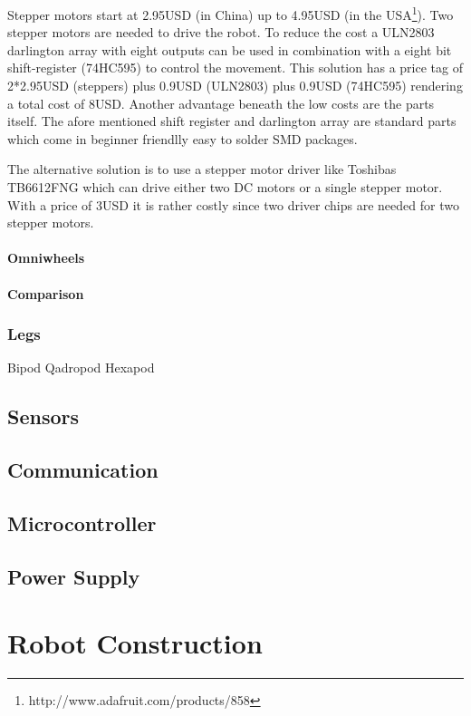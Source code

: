 \documentclass[twocolumn]{article}
\begin{document}
Stepper motors start at 2.95USD (in China) up to 4.95USD (in the USA\footnote{http://www.adafruit.com/products/858}). Two stepper motors are needed to drive the robot. To reduce the cost a ULN2803 darlington array with eight outputs can be used in combination with a eight bit shift-register (74HC595) to control the movement. This solution has a price tag of 2*2.95USD (steppers) plus 0.9USD (ULN2803) plus 0.9USD (74HC595) rendering a total cost of 8USD. Another advantage beneath the low costs are the parts itself. The afore mentioned shift register and darlington array are standard parts which come in beginner friendlly easy to solder SMD packages. 

The alternative solution is to use a stepper motor driver like Toshibas TB6612FNG which can drive either two DC motors or a single stepper motor. With a price of 3USD it is rather costly since two driver chips are needed for two stepper motors.

\paragraph{Omniwheels}

\paragraph{Comparison}


\subsubsection{Legs}
Bipod
Qadropod
Hexapod

\subsection{Sensors}
\subsection{Communication}
\subsection{Microcontroller}
\subsection{Power Supply}

\section{Robot Construction}



\nocite{*}
\printbibliography
{}
\end{document}

